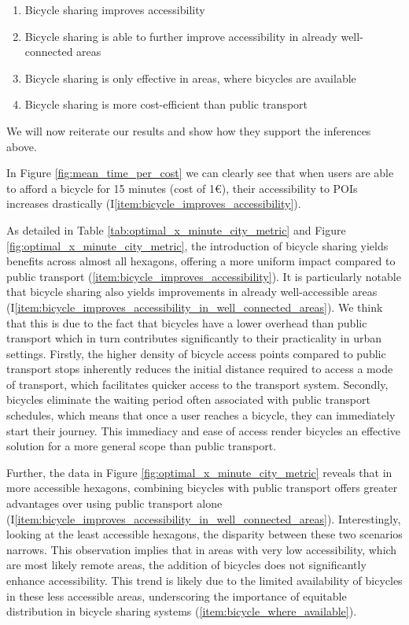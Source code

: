 \begin{enumerate}
  \renewcommand{\labelenumi}{I\theenumi.}
  \item Bicycle sharing improves accessibility \label{item:bicycle_improves_accessibility}
  \item Bicycle sharing is able to further improve accessibility in already well-connected areas \label{item:bicycle_improves_accessibility_in_well_connected_areas}
  \item Bicycle sharing is only effective in areas, where bicycles are available \label{item:bicycle_where_available}
  \item Bicycle sharing is more cost-efficient than public transport \label{item:bicycle_more_cost_efficient_than_pt}
\end{enumerate}

We will now reiterate our results and show how they support the inferences above.

In Figure \ref{fig:mean_time_per_cost} we can clearly see that when users are able to afford a bicycle for 15 minutes (cost of 1€), their accessibility to POIs increases drastically (I\ref{item:bicycle_improves_accessibility}).

As detailed in Table \ref{tab:optimal_x_minute_city_metric} and Figure \ref{fig:optimal_x_minute_city_metric}, the introduction of bicycle sharing yields benefits across almost all hexagons, offering a more uniform impact compared to public transport (\ref{item:bicycle_improves_accessibility}).
It is particularly notable that bicycle sharing also yields improvements in already well-accessible areas (I\ref{item:bicycle_improves_accessibility_in_well_connected_areas}).
We think that this is due to the fact that bicycles have a lower overhead than public transport which in turn contributes significantly to their practicality in urban settings.
Firstly, the higher density of bicycle access points compared to public transport stops inherently reduces the initial distance required to access a mode of transport, which  facilitates quicker access to the transport system. 
Secondly, bicycles eliminate the waiting period often associated with public transport schedules, which means that once a user reaches a bicycle, they can immediately start their journey. 
This immediacy and ease of access render bicycles an effective solution for a more general scope than public transport.

Further, the data in Figure \ref{fig:optimal_x_minute_city_metric} reveals that in more accessible hexagons, combining bicycles with public transport offers greater advantages over using public transport alone (I\ref{item:bicycle_improves_accessibility_in_well_connected_areas}).
Interestingly, looking at the least accessible hexagons, the disparity between these two scenarios narrows. 
This observation implies that in areas with very low accessibility, which are most likely remote areas, the addition of bicycles does not significantly enhance accessibility.
This trend is likely due to the limited availability of bicycles in these less accessible areas, underscoring the importance of equitable distribution in bicycle sharing systems (\ref{item:bicycle_where_available}).

